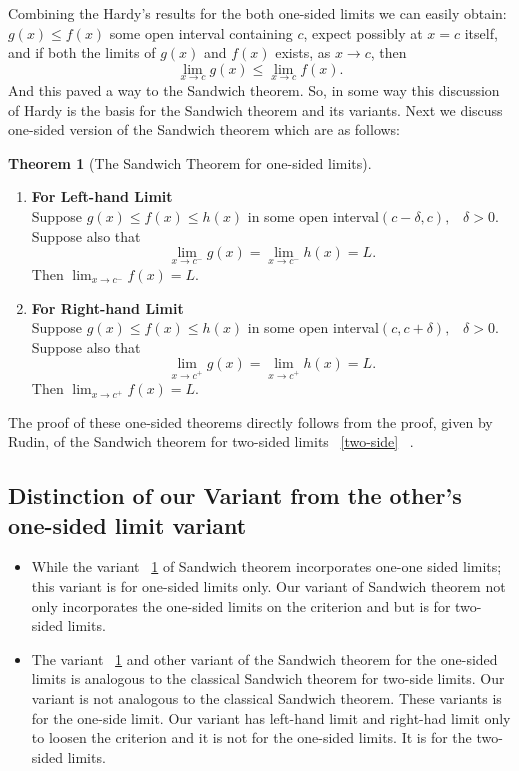 \documentclass[a4paper,twoside,12pt]{article}
\theoremstyle{plain}
\theoremstyle{definition}
\theoremstyle{theorem}
\newtheorem{thm}{Theorem}
\begin{document}
{Combining the Hardy's results for the both one-sided limits we can easily obtain: $g(x) \leq f(x)$ some open interval containing $c$, expect possibly at $x=c$ itself, and if both the limits of $g(x)$ and $f(x)$ exists, as $x \to c$, then $$\lim_{x \to c} g(x) \leq  \lim_{x \to c} f(x).$$ And this paved a way to the Sandwich theorem. So, in some way this discussion of Hardy is the basis for the Sandwich theorem and its variants. Next we discuss one-sided version of the Sandwich theorem which are as follows:

\begin{thm}[The Sandwich Theorem for one-sided limits] \cite{thomas}
  \label{one-side}
  \begin{enumerate}
  \item \textbf{For Left-hand Limit} \\[1mm]
    Suppose $g(x) \leq f(x) \leq h(x)$ in some open interval$(c-\delta, c), \;\;\; \delta > 0$. Suppose also that $$\lim_{x \to c^-} g(x) = \lim_{x \to c^-} h(x) =L  .$$ Then $\displaystyle \lim_{x \to c^-} f(x)=L$.

  \item \textbf{For Right-hand Limit} \\[1mm]
    Suppose $g(x) \leq f(x) \leq h(x)$ in some open interval$(c, c+\delta), \;\;\; \delta > 0$. Suppose also that $$\lim_{x \to c^+} g(x) = \lim_{x \to c^+} h(x) =L  .$$ Then $\displaystyle \lim_{x \to c^+} f(x)=L$.
  \end{enumerate}

\end{thm}
The proof of these one-sided theorems directly follows from the proof, given by Rudin, of the Sandwich theorem for two-sided limits ~\ref{two-side} ~\cite{rudin}.

\subsection{Distinction of our Variant from the other's one-sided limit variant}
\begin{itemize}
\item While the variant ~\ref{one-side} of Sandwich theorem incorporates one-one sided limits; this variant is for one-sided limits only. Our variant of Sandwich theorem not only incorporates the one-sided limits on the criterion and but is for two-sided limits.

\item The variant ~\ref{one-side} and other variant of the Sandwich theorem for the one-sided limits is analogous to the classical Sandwich theorem for two-side limits. Our variant is not analogous to the classical Sandwich theorem. These variants  is for the one-side limit. Our variant has left-hand limit and right-had limit only to loosen the criterion and it is not for the one-sided limits. It is for the two-sided limits.
\end{itemize}

}
\end{document}
